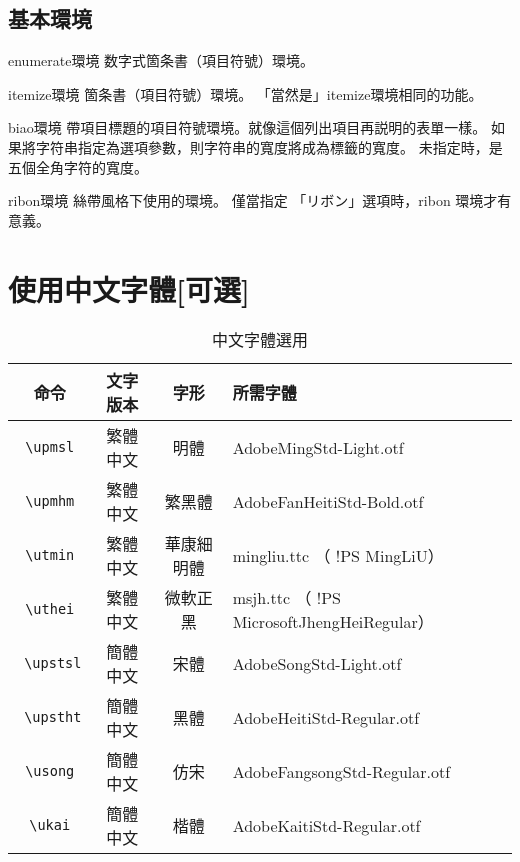 \documentclass[a4,11pt,uplatex,openleft]{jsarticle}
\begin{document}
\subsection{基本環境}

\begin{biao}[　　　  　　　　　]
\item[enumerate環境]数字式箇条書（項目符號）環境。

\item[itemize環境]\makebox[1zw][c]{\textbullet}箇条書（項目符號）環境。
「當然是」itemize環境相同的功能。
\item[biao環境]帶項目標題的項目符號環境。就像這個列出項目再説明的表單一樣。
如果將字符串指定為選項參數，則字符串的寬度將成為標籤的寬度。
未指定時，是五個全角字符的寬度。
\item[ribon環境] 絲帶風格下使用的環境。
僅當指定 「リボン」選項時，ribon 環境才有意義。
\end{biao}


\section{使用中文字體[可選]}

\begin{table}[h]
\caption{\fontsize{12pt}{15pt}\selectfont 中文字體選用} %
\centering %
\begin{tabular}{|c|c|c|p{7cm}|}%

\hline
命令    & 文字版本   & 字形    & 所需字體 \\
\hline
\verb+ \upmsl + & 繁體中文 &  明體    &    AdobeMingStd-Light.otf \\
\hline
\verb+ \upmhm + & 繁體中文 & 繁黑體   &   AdobeFanHeitiStd-Bold.otf \\
\hline
\verb+ \utmin + & 繁體中文 & 華康細明體 & mingliu.ttc （ !PS MingLiU） \\
\hline
\verb+ \uthei + & 繁體中文 & 微軟正黑  &  msjh.ttc  （ !PS MicrosoftJhengHeiRegular）\\
\hline
\verb+ \upstsl + & 簡體中文 &  宋體    &    AdobeSongStd-Light.otf\\
\hline
\verb+ \upstht + & 簡體中文 & 黑體  &      AdobeHeitiStd-Regular.otf\\
\hline
\verb+ \usong + & 簡體中文 & 仿宋   &     AdobeFangsongStd-Regular.otf\\
\hline
\verb+ \ukai + & 簡體中文 & 楷體     &   AdobeKaitiStd-Regular.otf \\
\hline

\end{tabular}
\end{table}
\end{document}
